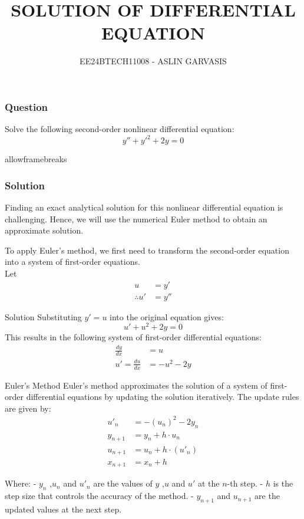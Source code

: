 \documentclass{beamer}
\begin{document}
\title{SOLUTION OF DIFFERENTIAL EQUATION}
\author{EE24BTECH11008 - ASLIN GARVASIS}
\date{}
\frame{\titlepage}

\begin{frame}
\frametitle{Question}
Solve the following second-order nonlinear differential equation:
\begin{equation}
y'' + y'^2 + 2y = 0
\end{equation}
  \end{frame}
  \begin{frame}{allowframebreaks}
\frametitle{Solution}
Finding an exact analytical solution for this nonlinear differential equation is challenging. Hence, we will use the numerical Euler method to obtain an approximate solution.

To apply Euler’s method, we first need to transform the second-order equation into a system of first-order equations.\\
Let
\begin{align}
u &= y'\\
\therefore u' &= y''
\end{align}
\end{frame}
\begin{frame}{Solution}
   Substituting \( y' = u \) into the original equation gives:
\begin{equation}
u' + u^2 + 2y = 0
\end{equation}
This results in the following system of first-order differential equations:
\begin{align}
\frac{dy}{dx} &= u \\
u' =\frac{du}{dx} &= -u^2 - 2y
\end{align}

\end{frame}
\begin{frame}{Euler's Method}
Euler's method approximates the solution of a system of first-order differential equations by updating the solution iteratively. The update rules are given by:
\begin{align}
u'_{n} &= -(u_n)^2 - 2y_n \\	
y_{n+1} &= y_n + h \cdot u_n \\
u_{n+1} &= u_n + h \cdot (u'_n) \\
x_{n+1} &= x_n + h 
\end{align}

Where:
- \( y_n \) ,\( u_n \) and \( u'_n \) are the values of \( y \) ,\( u \) and \( u' \) at the \( n \)-th step.
- \( h \) is the step size that controls the accuracy of the method.
- \( y_{n+1} \) and \( u_{n+1} \) are the updated values at the next step.


\end{frame}
\end{document}
